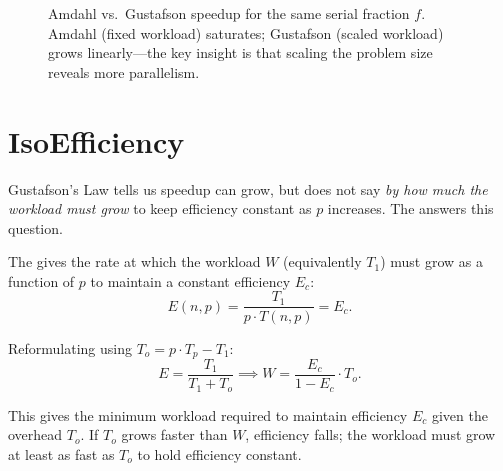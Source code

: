 \begin{figure}[h]
\centering
{}
\caption{Amdahl vs.\ Gustafson speedup for the same serial fraction $f$.
         Amdahl (fixed workload) saturates; Gustafson (scaled workload) grows
         linearly---the key insight is that scaling the problem size reveals
         more parallelism.}
\label{fig:amdahl-vs-gustafson}
\end{figure}

\section{IsoEfficiency}

Gustafson's Law tells us speedup can grow, but does not say \emph{by how much
the workload must grow} to keep efficiency constant as $p$ increases. The
 answers this question.

\begin{ppdefn}
The  gives the rate at which the workload $W$
(equivalently $T_1$) must grow as a function of $p$ to maintain a constant
efficiency $E_c$:
\[
  E(n, p) = \frac{T_1}{p \cdot T(n, p)} = E_c.
\]
\end{ppdefn}

Reformulating using $T_o = p \cdot T_p - T_1$:
\[
  E = \frac{T_1}{T_1 + T_o} \implies W = \frac{E_c}{1 - E_c} \cdot T_o.
\]

This gives the minimum workload required to maintain efficiency $E_c$ given
the overhead $T_o$. If $T_o$ grows faster than $W$, efficiency falls; the
workload must grow at least as fast as $T_o$ to hold efficiency constant.

